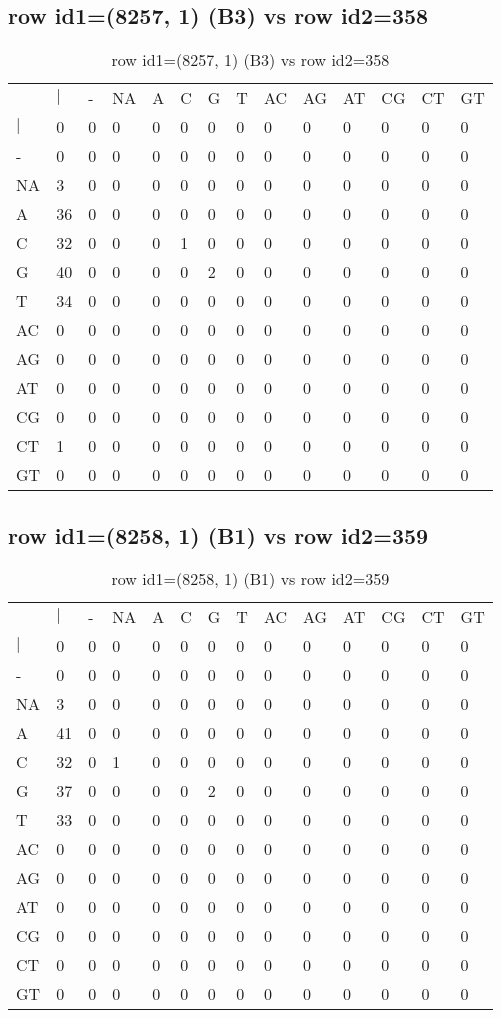\subsection{row id1=(8257, 1) (B3) vs row id2=358}
\begin{center}
\begin{longtable}{|l|l|l|l|l|l|l|l|l|l|l|l|l|l|}
\caption{row id1=(8257, 1) (B3) vs row id2=358} \label{table_dm200}\\
\hline
\\
\hline
&$|$&-&NA&A&C&G&T&AC&AG&AT&CG&CT&GT\\
$|$&0&0&0&0&0&0&0&0&0&0&0&0&0\\
-&0&0&0&0&0&0&0&0&0&0&0&0&0\\
NA&3&0&0&0&0&0&0&0&0&0&0&0&0\\
A&36&0&0&0&0&0&0&0&0&0&0&0&0\\
C&32&0&0&0&1&0&0&0&0&0&0&0&0\\
G&40&0&0&0&0&2&0&0&0&0&0&0&0\\
T&34&0&0&0&0&0&0&0&0&0&0&0&0\\
AC&0&0&0&0&0&0&0&0&0&0&0&0&0\\
AG&0&0&0&0&0&0&0&0&0&0&0&0&0\\
AT&0&0&0&0&0&0&0&0&0&0&0&0&0\\
CG&0&0&0&0&0&0&0&0&0&0&0&0&0\\
CT&1&0&0&0&0&0&0&0&0&0&0&0&0\\
GT&0&0&0&0&0&0&0&0&0&0&0&0&0\\
\hline
\end{longtable}
\end{center}

\subsection{row id1=(8258, 1) (B1) vs row id2=359}
\begin{center}
\begin{longtable}{|l|l|l|l|l|l|l|l|l|l|l|l|l|l|}
\caption{row id1=(8258, 1) (B1) vs row id2=359} \label{table_dm202}\\
\hline
\\
\hline
&$|$&-&NA&A&C&G&T&AC&AG&AT&CG&CT&GT\\
$|$&0&0&0&0&0&0&0&0&0&0&0&0&0\\
-&0&0&0&0&0&0&0&0&0&0&0&0&0\\
NA&3&0&0&0&0&0&0&0&0&0&0&0&0\\
A&41&0&0&0&0&0&0&0&0&0&0&0&0\\
C&32&0&1&0&0&0&0&0&0&0&0&0&0\\
G&37&0&0&0&0&2&0&0&0&0&0&0&0\\
T&33&0&0&0&0&0&0&0&0&0&0&0&0\\
AC&0&0&0&0&0&0&0&0&0&0&0&0&0\\
AG&0&0&0&0&0&0&0&0&0&0&0&0&0\\
AT&0&0&0&0&0&0&0&0&0&0&0&0&0\\
CG&0&0&0&0&0&0&0&0&0&0&0&0&0\\
CT&0&0&0&0&0&0&0&0&0&0&0&0&0\\
GT&0&0&0&0&0&0&0&0&0&0&0&0&0\\
\hline
\end{longtable}
\end{center}

